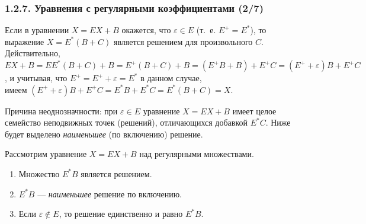 \begin{frame}
\frametitle{1.2.7. Уравнения с регулярными коэффициентами (2/7)}
\begin{example}
Если в уравнении $X=EX+B$
окажется, что $\varepsilon\in E$
(т.~е. $E^+=E^*$), то
выражение $X=E^*(B+C)$ 
является решением для произвольного $C$.  
Действительно, $EX +B= EE^*(B+C) +B =
E^+(B+C) +B= (E^+B+B)+E^+C =
(E^++\varepsilon)B + E^+C$,
и учитывая, что $E^+=E^++\varepsilon=E^*$  в данном случае, \\имеем 
$(E^++\varepsilon)B + E^+C = E^*B+E^*C=E^*(B+C)=X$.
\end{example}

\begin{remark}
Причина неоднозначности: при $\varepsilon\in E$ уравнение $X=EX+B$
имеет целое семейство неподвижных точек (решений), отличающихся добавкой $E^*C$.
Ниже будет выделено \emph{наименьшее} (по включению) решение.
\end{remark}

\begin{theorem}
Рассмотрим уравнение $X=EX+B$ над регулярными множествами.
\begin{enumerate}
\item Множество $E^*B$ является решением.
\item $E^*B$ --- \emph{наименьшее} решение по включению.
\item Если $\varepsilon\notin E$, то решение единственно и равно $E^*B$.
\end{enumerate}
\end{theorem}
\end{frame}

